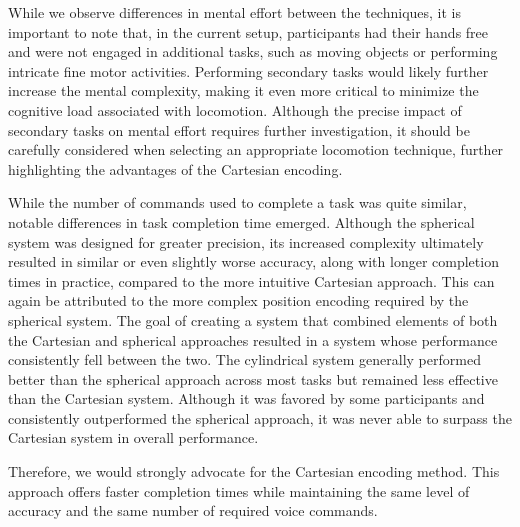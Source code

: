 \documentclass[preprint,12pt]{elsarticle}
\newcommand{\reftext}[1]{{\color{gray}#1}}   %
\begin{document}
\reftext{While we observe differences in mental effort between the techniques, it is important to note that, in the current setup, participants had their hands free and were not engaged in additional tasks, such as moving objects or performing intricate fine motor activities. Performing secondary tasks would likely further increase the mental complexity, making it even more critical to minimize the cognitive load associated with locomotion. Although the precise impact of secondary tasks on mental effort requires further investigation, it should be carefully considered when selecting an appropriate locomotion technique, further highlighting the advantages of the Cartesian encoding.}

\reftext{While the number of commands used to complete a task was quite similar, notable differences in task completion time emerged. Although the spherical system was designed for greater precision, its increased complexity ultimately resulted in similar or even slightly worse accuracy, along with longer completion times in practice, compared to the more intuitive Cartesian approach. This can again be attributed to the more complex position encoding required by the spherical system. The goal of creating a system that combined elements of both the Cartesian and spherical approaches resulted in a system whose performance consistently fell between the two. The cylindrical system generally performed better than the spherical approach across most tasks but remained less effective than the Cartesian system. Although it was favored by some participants and consistently outperformed the spherical approach, it was never able to surpass the Cartesian system in overall performance.}

\reftext{Therefore, we would strongly advocate for the Cartesian encoding method. This approach offers faster completion times while maintaining the same level of accuracy and the same number of required voice commands.}
\end{document}
